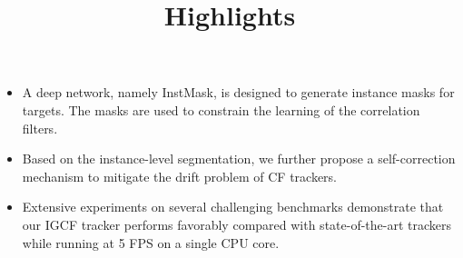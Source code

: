 \documentclass[preprint,12pt]{article}
\title{Highlights}
\date{}
\begin{document}

\maketitle
\begin{itemize}
    \item A deep network, namely InstMask, is designed to generate instance masks for targets. The masks are used to constrain the learning of the correlation filters.
    \item Based on the instance-level segmentation, we further propose a self-correction mechanism to mitigate the drift problem of CF trackers.
    \item Extensive experiments on several challenging benchmarks demonstrate that our IGCF tracker performs favorably compared with state-of-the-art trackers while running at 5 FPS on a single CPU core.
\end{itemize}



\end{document}
